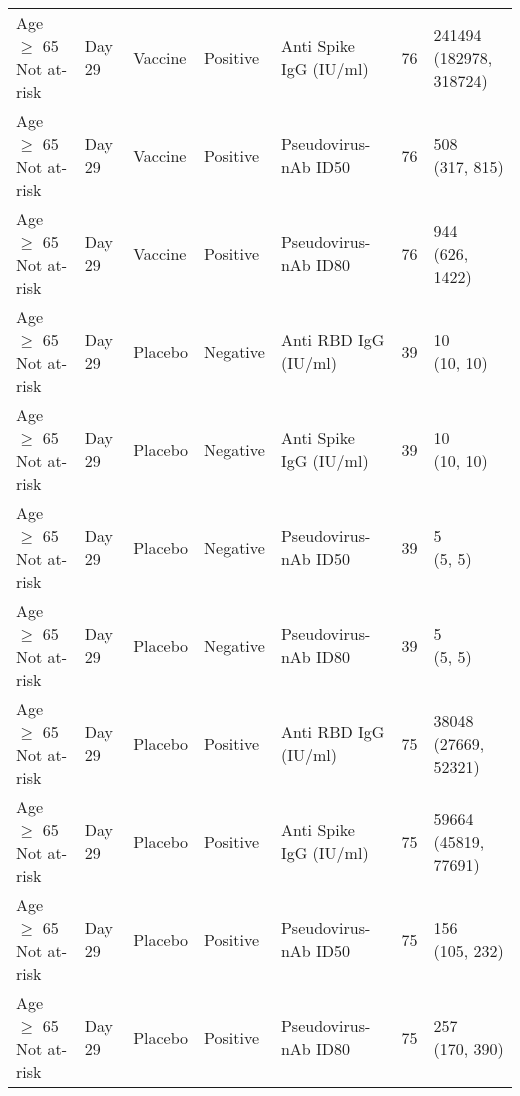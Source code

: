 \documentclass[]{book}
\theoremstyle{definition}
\theoremstyle{definition}
\theoremstyle{definition}
\newcommand{\1}{\mathbbm{1}}
\begin{document}
\begin{landscape}
\begin{ThreePartTable}
\begin{longtable}[t]{>{\raggedright\arraybackslash}p{7cm}llllll}
\hspace{1em}Age $\geq$ 65 Not at-risk & Day 29 & Vaccine & Positive & Anti Spike IgG (IU/ml) & 76 & \makecell[l]{241494\\(182978, 318724)}\\
\hspace{1em}Age $\geq$ 65 Not at-risk & Day 29 & Vaccine & Positive & Pseudovirus-nAb ID50 & 76 & \makecell[l]{508\\(317, 815)}\\
\hspace{1em}Age $\geq$ 65 Not at-risk & Day 29 & Vaccine & Positive & Pseudovirus-nAb ID80 & 76 & \makecell[l]{944\\(626, 1422)}\\
\hspace{1em}Age $\geq$ 65 Not at-risk & Day 29 & Placebo & Negative & Anti RBD IgG (IU/ml) & 39 & \makecell[l]{10\\(10, 10)}\\
\hspace{1em}Age $\geq$ 65 Not at-risk & Day 29 & Placebo & Negative & Anti Spike IgG (IU/ml) & 39 & \makecell[l]{10\\(10, 10)}\\
\hspace{1em}Age $\geq$ 65 Not at-risk & Day 29 & Placebo & Negative & Pseudovirus-nAb ID50 & 39 & \makecell[l]{5\\(5, 5)}\\
\hspace{1em}Age $\geq$ 65 Not at-risk & Day 29 & Placebo & Negative & Pseudovirus-nAb ID80 & 39 & \makecell[l]{5\\(5, 5)}\\
\hspace{1em}Age $\geq$ 65 Not at-risk & Day 29 & Placebo & Positive & Anti RBD IgG (IU/ml) & 75 & \makecell[l]{38048\\(27669, 52321)}\\
\hspace{1em}Age $\geq$ 65 Not at-risk & Day 29 & Placebo & Positive & Anti Spike IgG (IU/ml) & 75 & \makecell[l]{59664\\(45819, 77691)}\\
\hspace{1em}Age $\geq$ 65 Not at-risk & Day 29 & Placebo & Positive & Pseudovirus-nAb ID50 & 75 & \makecell[l]{156\\(105, 232)}\\
\hspace{1em}Age $\geq$ 65 Not at-risk & Day 29 & Placebo & Positive & Pseudovirus-nAb ID80 & 75 & \makecell[l]{257\\(170, 390)}\\

\end{longtable}
\end{ThreePartTable}
\end{landscape}
\end{document}
